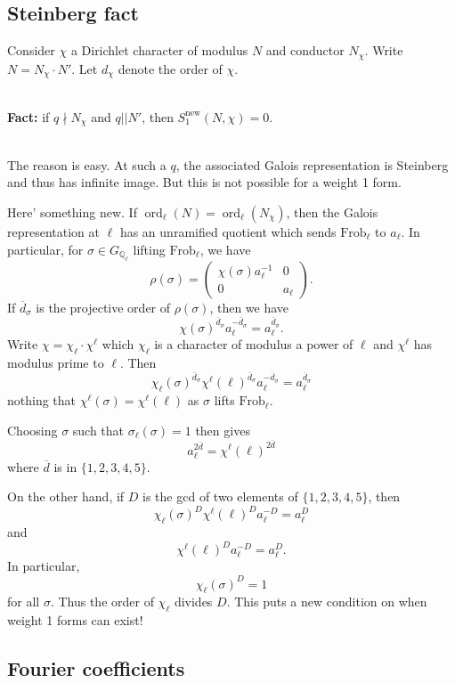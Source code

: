 \documentclass[11pt]{amsart}
\theoremstyle{plain}
\theoremstyle{definition}
\newcommand{\Q}{{\mathbb Q}}
\DeclareMathOperator{\ord}{ord}
\DeclareMathOperator{\new}{new}
\newcommand{\Frob}{\text{Frob}}
\renewcommand{\[}{\left[}
\renewcommand{\]}{\right]}
\begin{document}
\subsection{Steinberg fact}
Consider $\chi$ a Dirichlet character of modulus $N$ and conductor $N_\chi$.  Write $N = N_\chi \cdot N'$.  Let $d_\chi$ denote the order of $\chi$.

~\\

\noindent
{\bf Fact:} if $q \nmid N_\chi$ and $q || N'$, then $S_1^{\new}(N,\chi) = 0$.  

~\\

The reason is easy.  At such a $q$, the associated Galois representation is Steinberg and thus has infinite image.  But this is not possible for a weight 1 form.

Here' something new.  If $\ord_
\ell(N) = \ord_\ell(N_\chi)$, then the Galois representation at $\ell$ has an unramified quotient which sends $\Frob_\ell$ to $a_\ell$.  In particular, for $\sigma \in G_{\Q_\ell}$ lifting $\Frob_\ell$, we have
$$
\rho(\sigma) = 
\begin{pmatrix}
\chi(\sigma) a_\ell^{-1} & 0 \\
0 & a_\ell
\end{pmatrix}.
$$
If $\overline{d}_\sigma$ is the projective order of $\rho(\sigma)$, then we have 
$$
\chi(\sigma)^{\overline{d}_\sigma} a_\ell^{-\overline{d}_\sigma} = a_\ell^{\overline{d}_\sigma}.
$$
Write $\chi = \chi_\ell \cdot \chi^{\ell}$ which $\chi_\ell$ is a character of modulus a power of $\ell$ and $\chi^{\ell}$ has modulus prime to $\ell$.  Then 
$$
\chi_\ell(\sigma)^{\overline{d}_\sigma} \chi^\ell(\ell)^{\overline{d}_\sigma}  a_\ell^{-\overline{d}_\sigma} = a_\ell^{\overline{d}_\sigma}
$$
nothing that $\chi^\ell(\sigma) = \chi^\ell(\ell)$ as $\sigma$ lifts $\Frob_\ell$.

Choosing $\sigma$ such that $\sigma_\ell(\sigma) = 1$ then gives
$$
a_\ell^{2 \overline{d}} = \chi^{\ell}(\ell)^{2\overline{d}}
$$
where $\overline{d}$ is in $\{1,2,3,4,5\}$.

On the other hand, if $D$ is the gcd of two elements of $\{1,2,3,4,5\}$, then 
$$
\chi_\ell(\sigma)^D \chi^\ell(\ell)^D  a_\ell^{-D} = a_\ell^D
$$
and
$$
\chi^\ell(\ell)^D  a_\ell^{-D} = a_\ell^D.
$$
In particular,
$$
\chi_\ell(\sigma)^D = 1
$$
for all $\sigma$.  Thus the order of $\chi_\ell$ divides $D$.  This puts a new condition on when weight 1 forms can exist!


\subsection{Fourier coefficients}
\end{document}
